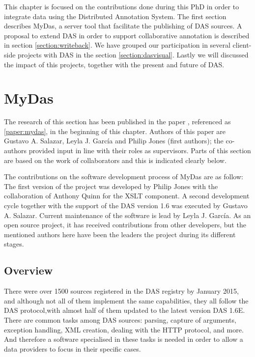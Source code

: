 This chapter is focused on the contributions done during this PhD in order to integrate data using the Distributed Annotation System. The first section describes  MyDas, a server tool that facilitate the publishing of DAS sources. A proposal to extend DAS in order to support collaborative annotation is described in section \ref{section:writeback}. We have grouped our participation in several client-side projects with DAS in the section \ref{section:dasvisual}. Lastly we will discussed the impact of this projects, together with the present and future of DAS.


\section{MyDas} \label{section:mydas}

The research of this section has been published in the paper \cite{SAL2012}, referenced as \ref{paper:mydas}, in the beginning of this chapter. 
Authors of this paper are Gustavo A. Salazar, Leyla J. García and Philip Jones (first authors); the co-authors provided input in line with their roles as supervisors.  Parts of this section are based on the work of collaborators and this is indicated clearly below. 

The contributions on the software development process of MyDas are as follow: The first version of the project was developed by Philip Jones with the collaboration of Anthony Quinn for the XSLT component. A second development cycle together with the support of the DAS version 1.6 was executed by Gustavo A. Salazar. Current maintenance of the software is lead by Leyla J. García. As an open source project, it has received contributions from other developers, but the mentioned authors here have been the leaders the project during its different stages.

\subsection{Overview}

There were over 1500 sources registered in the DAS registry by January 2015, and although not all of them implement the same capabilities, they all follow the DAS protocol,with almost half of them updated to the latest version DAS 1.6E. There are common tasks among DAS sources:  parsing, capture of arguments, exception handling, XML creation, dealing with the HTTP protocol, and more. And therefore a software specialised in these tasks is needed in order to allow a data providers to focus in their specific cases.

